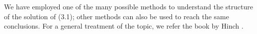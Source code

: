 \documentclass[12pt]{report}   %
\newcommand{\Ndg}{\tilde{N}_g}
\begin{document}
% 
% 
We have employed one of the many possible methods to understand the structure of the solution of (3.1); other methods can also be used to reach the same conclusions.
For a general treatment of the topic, we refer the book by Hinch \cite{Hinch1991}. %

%
\clearpage{\pagestyle{empty}\cleardoublepage}

%

\nocite{*}

\begin{spacing}{0.9}
  
\end{spacing}
\end{document}
